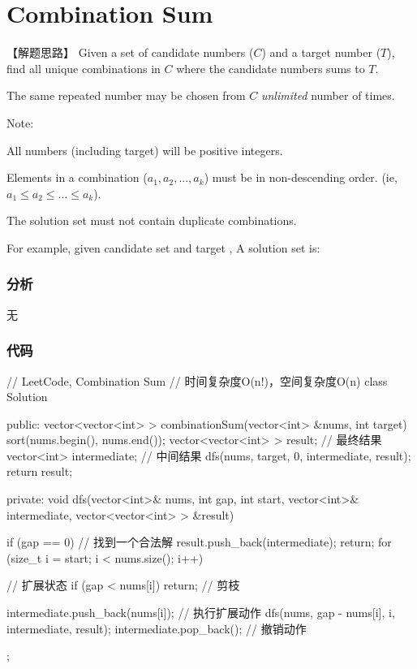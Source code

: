 \section{Combination Sum} %
\label{sec:combination-sum}


【解题思路】
Given a set of candidate numbers ($C$) and a target number ($T$), find all unique combinations in $C$ where the candidate numbers sums to $T$.

The same repeated number may be chosen from $C$ \emph{unlimited} number of times.

Note:
\begindot
\item All numbers (including target) will be positive integers.
\item Elements in a combination ($a_1, a_2, ..., a_k$) must be in non-descending order. (ie, $a_1 \leq a_2 \leq ... \leq a_k$).
\item The solution set must not contain duplicate combinations.
\myenddot

For example, given candidate set  and target , 
A solution set is: 
\begin{Code}
	[7] 
	[2, 2, 3] 
\end{Code}


\subsubsection{分析}
无


\subsubsection{代码}
\begin{Code}
	// LeetCode, Combination Sum
	// 时间复杂度O(n!)，空间复杂度O(n)
	class Solution {
		public:
		vector<vector<int> > combinationSum(vector<int> &nums, int target) {
			sort(nums.begin(), nums.end());
			vector<vector<int> > result; // 最终结果
			vector<int> intermediate; // 中间结果
			dfs(nums, target, 0, intermediate, result);
			return result;
		}
		
		private:
		void dfs(vector<int>& nums, int gap, int start, vector<int>& intermediate,
		vector<vector<int> > &result) {
			if (gap == 0) {  // 找到一个合法解
				result.push_back(intermediate);
				return;
			}
			for (size_t i = start; i < nums.size(); i++) { // 扩展状态
				if (gap < nums[i]) return; // 剪枝
				
				intermediate.push_back(nums[i]); // 执行扩展动作
				dfs(nums, gap - nums[i], i, intermediate, result);
				intermediate.pop_back();  // 撤销动作
			}
		}
	};
\end{Code}



